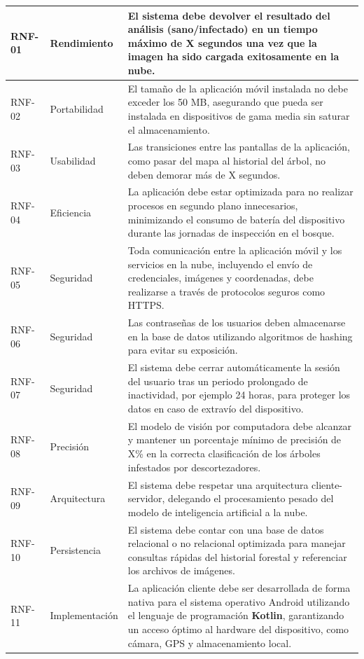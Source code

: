 \begin{longtable}{|>{\centering\arraybackslash}m{1.8cm}|>{\centering\arraybackslash}m{2.5cm}|m{9.5cm}|}
RNF-01 & Rendimiento & El sistema debe devolver el resultado del análisis (sano/infectado) en un tiempo máximo de X segundos una vez que la imagen ha sido cargada exitosamente en la nube. \\
\hline
RNF-02 & Portabilidad & El tamaño de la aplicación móvil instalada no debe exceder los 50 MB, asegurando que pueda ser instalada en dispositivos de gama media sin saturar el almacenamiento. \\
\hline
RNF-03 & Usabilidad & Las transiciones entre las pantallas de la aplicación, como pasar del mapa al historial del árbol, no deben demorar más de X segundos. \\
\hline
RNF-04 & Eficiencia & La aplicación debe estar optimizada para no realizar procesos en segundo plano innecesarios, minimizando el consumo de batería del dispositivo durante las jornadas de inspección en el bosque. \\
\hline
RNF-05 & Seguridad & Toda comunicación entre la aplicación móvil y los servicios en la nube, incluyendo el envío de credenciales, imágenes y coordenadas, debe realizarse a través de protocolos seguros como HTTPS. \\
\hline
RNF-06 & Seguridad & Las contraseñas de los usuarios deben almacenarse en la base de datos utilizando algoritmos de hashing para evitar su exposición. \\
\hline
RNF-07 & Seguridad & El sistema debe cerrar automáticamente la sesión del usuario tras un periodo prolongado de inactividad, por ejemplo 24 horas, para proteger los datos en caso de extravío del dispositivo. \\
\hline
RNF-08 & Precisión & El modelo de visión por computadora debe alcanzar y mantener un porcentaje mínimo de precisión de X\% en la correcta clasificación de los árboles infestados por descortezadores. \\
\hline
RNF-09 & Arquitectura & El sistema debe respetar una arquitectura cliente-servidor, delegando el procesamiento pesado del modelo de inteligencia artificial a la nube. \\
\hline
RNF-10 & Persistencia & El sistema debe contar con una base de datos relacional o no relacional optimizada para manejar consultas rápidas del historial forestal y referenciar los archivos de imágenes. \\
\hline
RNF-11 & Implementación & La aplicación cliente debe ser desarrollada de forma nativa para el sistema operativo Android utilizando el lenguaje de programación \textbf{Kotlin}, garantizando un acceso óptimo al hardware del dispositivo, como cámara, GPS y almacenamiento local. \\

\end{longtable}

